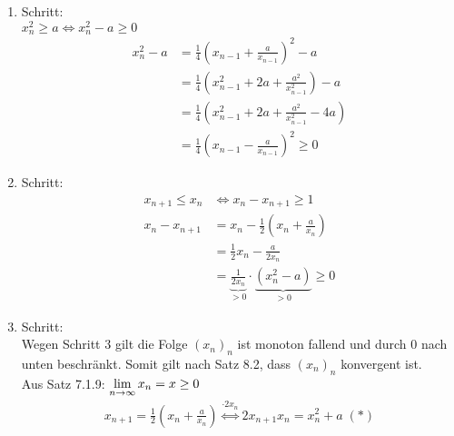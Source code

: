 \documentclass[../ana1u.tex]{subfiles}
\begin{document}
\begin{bsp}
\begin{bew}
\begin{enumerate}
                (IS): \(n \rightarrow n+1\): für beliebiges, aber festes n sei gezeigt, dass \(x_n > 0\)\\
                Dann gilt \(x_{n+1} = \frac{1}{2}(\underbrace{x_n}_{>0} + \underbrace{\frac{a}{x_n}}_{>0}) > 0\) wohldefiniert, weil \(x_n > 0\)\\
                Somit gilt nach dem Induktionsprinzip \(x_n > 0\) \(\forall n \in \N\)
            \item Schritt:\\
                \(x_n^2 \geq a \Leftrightarrow x_n^2 - a \geq 0 \)
                \begin{align*}
                    x_n^2 - a &= \frac{1}{4}\left(x_{n-1} + \frac{a}{x_{n-1}}\right)^2 - a\\
                    &= \frac{1}{4}\left(x_{n-1}^2 + 2a + \frac{a^2}{x_{n-1}^2}\right) - a\\
                    &= \frac{1}{4}\left(x_{n-1}^2 + 2a + \frac{a^2}{x_{n-1}^2} - 4a\right)\\
                    &= \frac{1}{4}\left(x_{n-1} - \frac{a}{x_{n-1}}\right)^2 \geq 0
                \end{align*}
            \item Schritt:\\
                \begin{align*}
                    x_{n+1} \leq x_n &\Leftrightarrow x_n - x_{n+1} \geq 1\\
                    x_n - x_{n+1} &= x_n - \frac{1}{2}(x_n + \frac{a}{x_n})\\
                    &=\frac{1}{2}x_n - \frac{a}{2x_n}\\
                    &= \underbrace{\frac{1}{2x_n}}_{>0} \cdot \underbrace{(x_n^2 - a)}_{>0} \geq 0
                \end{align*}
            \item Schritt:\\
                Wegen Schritt 3 gilt die Folge \((x_n)_n\) ist monoton fallend und durch 0 nach unten beschränkt. Somit gilt nach Satz 8.2, dass \((x_n)_n\) konvergent ist.\\
                Aus Satz 7.1.9:
                \(\lim\limits_{n\rightarrow\infty} x_n = x \geq 0\)
                \begin{align*}
                    x_{n+1} = \frac{1}{2}(x_n + \frac{a}{x_n}) \overset{\cdot 2x_n} {\Leftrightarrow} 2x_{n+1}x_n = x_n^2 + a \;(\ast)\\						
                \end{align*}

\end{enumerate}
\end{bew}
\end{bsp}
\end{document}
